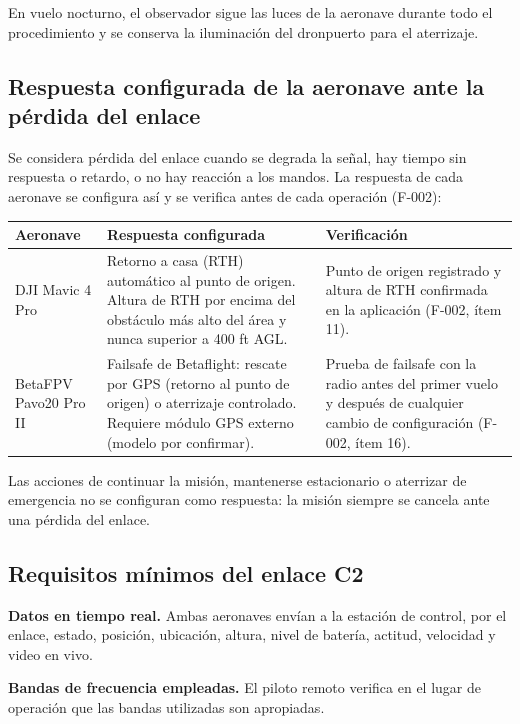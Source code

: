 En vuelo nocturno, el observador sigue las luces de la aeronave durante todo el procedimiento y se conserva la iluminación del dronpuerto para el aterrizaje.

\subsection{Respuesta configurada de la aeronave ante la pérdida del enlace}

Se considera pérdida del enlace cuando se degrada la señal, hay tiempo sin respuesta o retardo, o no hay reacción a los mandos. La respuesta de cada aeronave se configura así y se verifica antes de cada operación (F-002):

\renewcommand{\arraystretch}{1.3}
\begin{longtable}{|p{3cm}|p{5.5cm}|p{5.2cm}|}
\hline
\rowcolor[gray]{0.9}\textbf{Aeronave} & \textbf{Respuesta configurada} & \textbf{Verificación} \\ \hline
DJI Mavic 4 Pro & Retorno a casa (RTH) automático al punto de origen. Altura de RTH por encima del obstáculo más alto del área y nunca superior a 400 ft AGL. & Punto de origen registrado y altura de RTH confirmada en la aplicación (F-002, ítem 11). \\ \hline
BetaFPV Pavo20 Pro II & Failsafe de Betaflight: rescate por GPS (retorno al punto de origen) o aterrizaje controlado. Requiere módulo GPS externo (modelo por confirmar). & Prueba de failsafe con la radio antes del primer vuelo y después de cualquier cambio de configuración (F-002, ítem 16). \\ \hline
\end{longtable}

Las acciones de continuar la misión, mantenerse estacionario o aterrizar de emergencia no se configuran como respuesta: la misión siempre se cancela ante una pérdida del enlace.

\subsection{Requisitos mínimos del enlace C2}

\textbf{Datos en tiempo real.} Ambas aeronaves envían a la estación de control, por el enlace, estado, posición, ubicación, altura, nivel de batería, actitud, velocidad y video en vivo.

\textbf{Bandas de frecuencia empleadas.} El piloto remoto verifica en el lugar de operación que las bandas utilizadas son apropiadas.

